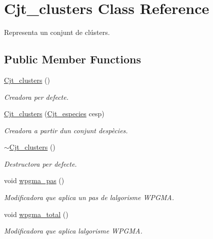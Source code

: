 \hypertarget{class_cjt__clusters}{}\section{Cjt\+\_\+clusters Class Reference}
\label{class_cjt__clusters}


Representa un conjunt de clústers.  


\subsection*{Public Member Functions}
\begin{DoxyCompactItemize}
\item 
\hyperlink{class_cjt__clusters_a10dd63eab0e8ea5b1ed13e81412d47a9}{Cjt\+\_\+clusters} ()
\begin{DoxyCompactList}\small\item\em Creadora per defecte. \end{DoxyCompactList}\item 
\hyperlink{class_cjt__clusters_aa52c1e5013ed206efccd70aaba9c037c}{Cjt\+\_\+clusters} (\hyperlink{class_cjt__especies}{Cjt\+\_\+especies} cesp)
\begin{DoxyCompactList}\small\item\em Creadora a partir d\textquotesingle{}un conjunt d\textquotesingle{}espècies. \end{DoxyCompactList}\item 
\hyperlink{class_cjt__clusters_aba7f00077ce77ba7963ac8084be4a000}{$\sim$\+Cjt\+\_\+clusters} ()
\begin{DoxyCompactList}\small\item\em Destructora per defecte. \end{DoxyCompactList}\item 
void \hyperlink{class_cjt__clusters_ae5d7fd65b9070ea2e7240d78fefd0f6e}{wpgma\+\_\+pas} ()
\begin{DoxyCompactList}\small\item\em Modificadora que aplica un pas de l\textquotesingle{}algorisme W\+P\+G\+MA. \end{DoxyCompactList}\item 
void \hyperlink{class_cjt__clusters_a755fca978c7d4b499e2c7b0963136354}{wpgma\+\_\+total} ()
\begin{DoxyCompactList}\small\item\em Modificadora que aplica l\textquotesingle{}algorisme W\+P\+G\+MA. \end{DoxyCompactList}\item 

\end{DoxyCompactItemize}
